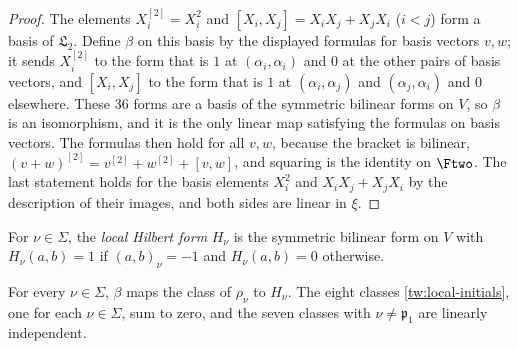 \begin{proof}
The elements $X_i^{[2]}=X_i^2$ and $[X_i,X_j]=X_iX_j+X_jX_i$ ($i<j$) form a
basis of $\mathfrak L_2$. Define $\beta$ on this basis by the displayed
formulas for basis vectors $v,w$; it sends $X_i^{[2]}$ to the form that is $1$
at $(\alpha_i,\alpha_i)$ and $0$ at the other pairs of basis vectors, and
$[X_i,X_j]$ to the form that is $1$ at $(\alpha_i,\alpha_j)$ and
$(\alpha_j,\alpha_i)$ and $0$ elsewhere. These $36$ forms are a basis of the
symmetric bilinear forms on $V$, so $\beta$ is an isomorphism, and it is the
only linear map satisfying the formulas on basis vectors. The formulas then
hold for all $v,w$, because the bracket is bilinear,
$(v+w)^{[2]}=v^{[2]}+w^{[2]}+[v,w]$, and squaring is the identity on $\Ftwo$.
The last statement holds for the basis elements $X_i^2$ and
$X_iX_j+X_jX_i$ by the description of their images, and both sides are
linear in $\xi$.
\end{proof}

\begin{definition}\label{tw:hilbert-form}
For $\nu\in\Sigma$, the \emph{local Hilbert form} $H_\nu$ is the symmetric
bilinear form on $V$ with $H_\nu(a,b)=1$ if $(a,b)_\nu=-1$ and
$H_\nu(a,b)=0$ otherwise.
\end{definition}

\begin{lemma}\label{tw:local-forms}
For every $\nu\in\Sigma$, $\beta$ maps the class of $\rho_\nu$ to $H_\nu$. The
eight classes \eqref{tw:local-initials}, one for each $\nu\in\Sigma$, sum to
zero, and the seven classes with $\nu\ne\mathfrak p_1$ are linearly
independent.
\end{lemma}

